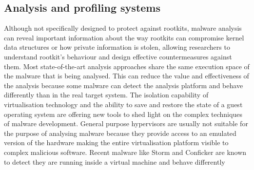 \subsection{Analysis and profiling systems} \label{profiling}
Although not specifically designed to protect against rootkits, malware analysis can reveal important information about the way rootkits can compromise kernel data structures or how private information is stolen, allowing researchers to understand rootkit's behaviour and design effective countermeasures against them. 
Most state-of-the-art analysis approaches share the same execution space of the malware that is being analysed. This can reduce the value and effectiveness of the analysis because some malware can detect the analysis platform and behave differently than in the real target system. 
The isolation capability of virtualisation technology and the ability to save and restore the state of a guest operating system are offering new tools to shed light on the complex techniques of malware development. 
General purpose hypervisors are usually not suitable for the purpose of analysing malware because they provide access to an emulated version of the hardware making the entire virtualisation platform visible to complex malicious software. 
Recent malware like Storm and Conficker are known to detect they are running inside a virtual machine and behave differently \cite{conficker, ecards}


